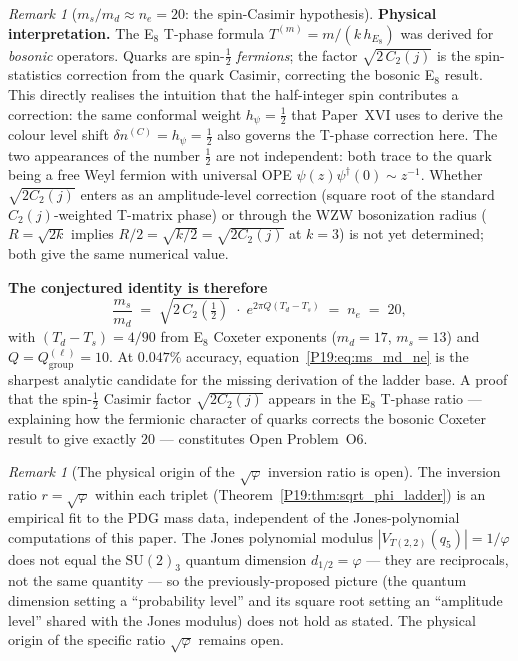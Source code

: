 \documentclass[11pt,a4paper]{article}
\theoremstyle{definition}\newtheorem{definition}[theorem]{Definition}
\theoremstyle{remark}
\newtheorem{remark}[theorem]{Remark}
\newcommand{\vp}{\varphi}
\newcommand{\Jones}{V}
\begin{document}
\begin{remark}[$m_s/m_d \approx n_e = 20$: the spin-Casimir hypothesis]
\textbf{Physical interpretation.}
The E$_8$ T-phase formula $T^{(m)}=m/(k\,h_{E_8})$ was derived
for \emph{bosonic} operators.  Quarks are spin-$\tfrac12$
\emph{fermions}; the factor $\sqrt{2\,C_2(j)}$ is the spin-statistics
correction from the quark Casimir, correcting the bosonic E$_8$
result.  This directly realises the intuition that the half-integer
spin contributes a correction: the same conformal weight
$h_\psi=\tfrac12$ that Paper~XVI uses to derive the colour level
shift $\delta n^{(C)}=h_\psi=\tfrac12$ also governs the
T-phase correction here.  The two appearances of the number
$\tfrac12$ are not independent: both trace to the quark being a
free Weyl fermion with universal OPE
$\psi(z)\psi^\dagger(0)\sim z^{-1}$.  Whether $\sqrt{2C_2(j)}$
enters as an amplitude-level correction (square root of the standard
$C_2(j)$-weighted T-matrix phase) or through the WZW bosonization
radius ($R=\sqrt{2k}$ implies $R/2=\sqrt{k/2}=\sqrt{2C_2(j)}$
at $k=3$) is not yet determined; both give the same numerical
value.

\textbf{The conjectured identity is therefore}
\begin{equation}
  \frac{m_s}{m_d}
  \;=\;
  \sqrt{2\,C_2\!\left(\tfrac12\right)}\;\cdot\;
  e^{2\pi Q(T_d-T_s)}
  \;=\; n_e \;=\; 20,
  \label{P19:eq:ms_md_ne}
\end{equation}
with $(T_d-T_s)=4/90$ from E$_8$ Coxeter exponents ($m_d=17$,
$m_s=13$) and $Q=Q_{\mathrm{group}}^{(\ell)}=10$.  At $0.047\%$
accuracy, equation~\eqref{P19:eq:ms_md_ne} is the sharpest analytic
candidate for the missing derivation of the ladder base.  A proof
that the spin-$\tfrac12$ Casimir factor $\sqrt{2C_2(j)}$ appears
in the E$_8$ T-phase ratio --- explaining how the fermionic
character of quarks corrects the bosonic Coxeter result to give
exactly $20$ --- constitutes Open Problem~O6.
\end{remark}

\begin{remark}[The physical origin of the $\sqrt{\vp}$ inversion ratio is open]
\label{P19:rem:sqrt_phi_meaning}
The inversion ratio $r=\sqrt{\vp}$ within each triplet
(Theorem~\ref{P19:thm:sqrt_phi_ladder}) is an empirical fit to the
PDG mass data, independent of the Jones-polynomial computations of
this paper.  The Jones polynomial modulus $|\Jones_{T(2,2)}(q_5)|=1/\vp$
does not equal the $\mathrm{SU}(2)_3$ quantum dimension
$d_{1/2}=\vp$ --- they are reciprocals, not the same quantity --- so
the previously-proposed picture (the quantum dimension setting a
``probability level'' and its square root setting an ``amplitude
level'' shared with the Jones modulus) does not hold as stated.  The
physical origin of the specific ratio $\sqrt{\vp}$ remains open.
\end{remark}
\end{document}

